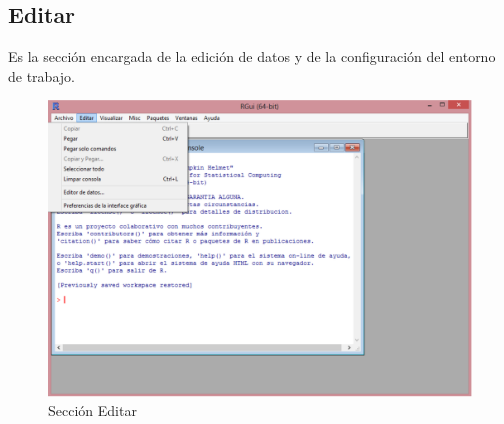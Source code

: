 \documentclass[11pt,a4paper,oneside]{book}\usepackage[]{graphicx}\usepackage[]{color}
\begin{document}
\subsection{Editar}

Es la sección encargada de la edición de datos y de la configuración del entorno de trabajo.
  \begin{itemize}
  \begin{figure}[H]
  \centering
  \includegraphics[scale=.4]{figuras/editar.eps}
  \caption{Sección Editar}
  \label{editar}
  \end{figure}


\end{itemize}
\end{document}

